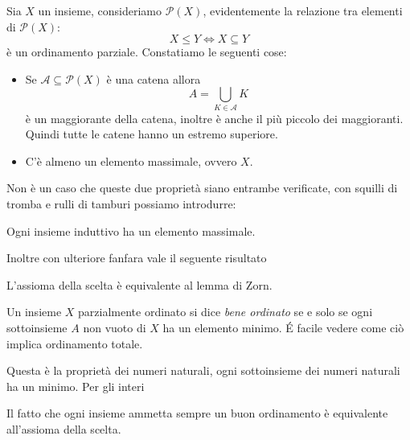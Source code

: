 \documentclass[11pt]{scrartcl}
\newcommand{\parti}{\mathcal{P}}
\begin{document}
  \begin{example}
  	Sia $X$ un insieme, consideriamo $\parti(X)$, evidentemente la relazione tra elementi di $\parti(X)$:
  	$$X\le Y \iff X\subseteq Y$$
  	è un ordinamento parziale. Constatiamo le seguenti cose:
  	\begin{itemize}
  		\item Se $\mathcal{A}\subseteq \parti(X)$ è una catena allora
  		$$A=\bigcup_{K\in \mathcal{A}}K$$
  		è un maggiorante della catena, inoltre è anche il più piccolo dei maggioranti. Quindi tutte le catene hanno un estremo superiore.
  		\item C'è almeno un elemento massimale, ovvero $X$.
  	\end{itemize}
  \end{example}
  Non è un caso che queste due proprietà siano entrambe verificate, con squilli di tromba e rulli di tamburi possiamo introdurre:
  \begin{lemma}[Zorn]
  	Ogni insieme induttivo ha un elemento massimale.
  \end{lemma}
  Inoltre con ulteriore fanfara vale il seguente risultato
  \begin{theorem}
  	L'assioma della scelta è equivalente al lemma di Zorn.
  \end{theorem}
  \begin{definition}
  	Un insieme $X$ parzialmente ordinato si dice \textit{bene ordinato} se e solo se ogni sottoinsieme $A$ non vuoto di $X$ ha un elemento minimo. \'E facile vedere come ciò implica ordinamento totale.
  \end{definition}
  Questa è la proprietà dei numeri naturali, ogni sottoinsieme dei numeri naturali ha un minimo. Per gli interi 
  
  \begin{theorem}
  	Il fatto che ogni insieme ammetta sempre un buon ordinamento è equivalente all'assioma della scelta.
  \end{theorem}
\end{document}
